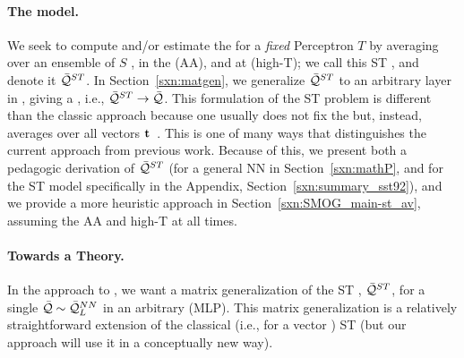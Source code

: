\paragraph{The \StudentTeacher model.}
We seek to compute and/or estimate the \AverageGeneralizationAccuracy for a \emph{fixed} \Teacher Perceptron $T$
by averaging over an ensemble of \Student $S$ \Perceptrons, in the \AnnealedApproximation (AA), and at
\HighTemperature (high-T); we call this ST \ModelQuality, and denote it $\bar{\mathcal{Q}}^{ST}$.
In Section~\ref{sxn:matgen}, we generalize $\bar{\mathcal{Q}}^{ST}$ to an
arbitrary layer in \MultiLayerPerceptron, giving a \LayerQuality, i.e., $\bar{\mathcal{Q}}^{ST}\rightarrow\bar{\mathcal{Q}}$.
This formulation of the ST problem is different than the classic approach because one
usually does not fix the \Teacher but, instead,
averages over all \Teacher vectors ${\mathbf{t}}$~\cite{SST92,engel2001statistical}.
This is one of many ways that distinguishes the current approach from previous work.
Because of this, we present both a pedagogic derivation of $\bar{\mathcal{Q}}^{ST}$
(for a general NN in Section~\ref{sxn:mathP}, and for the ST model specifically
in the Appendix, Section~\ref{sxn:summary_sst92}),
and we provide a more heuristic approach in Section~\ref{sxn:SMOG_main-st_av}, assuming
the AA and high-T at all times.


\paragraph{Towards a \SemiEmpirical Theory.}
In the \SETOL approach to \STATMECH, we want a matrix generalization of the ST \ModelQuality, $\bar{\mathcal{Q}}^{ST}$, for a single \LayerQuality
$\bar{\mathcal{Q}}\sim\bar{\mathcal{Q}}^{NN}_{L}$ in an arbitrary \MultiLayerPerceptron (MLP).
This matrix generalization is a relatively straightforward extension of the classical (i.e., for a vector \Teacher) \SMOG ST \ModelQuality (but our \SETOL approach will use it in a conceptually new way).

